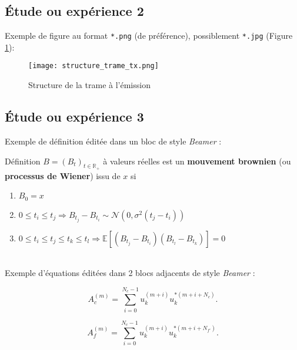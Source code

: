 \documentclass[11pt,a4paper,french]{article}
\def\Rset{\mathbb{R}} %
\def\Eset{\mathbb{E}} %
\begin{document}
\newpage %
\subsection{Étude ou expérience 2}\label{sec:SS_EXP2}

Exemple de figure au format \texttt{*.png} (de préférence), possiblement \texttt{*.jpg} (Figure \ref{fig:F_STRUCT_TRAME_TX}):

\begin{figure}[htb]
\centering
\texttt{[image: structure\_trame\_tx.png]}
\caption{Structure de la trame à l'émission}\label{fig:F_STRUCT_TRAME_TX}
\end{figure}

\subsection{Étude ou expérience 3}\label{sec:SS_EXP3}

Exemple de définition éditée dans un bloc de style \emph{Beamer} :

\begin{beamerblock}{Définition}
$B=(B_t)_{t\in\Rset_+}$ \`a valeurs r\'eelles est un {\bf mouvement brownien} (ou {\bf processus de Wiener}) issu de $x$ si
\begin{enumerate} 
\item $B_0=x$ 
\item $0\leq t_i\leq t_j \Rightarrow B_{t_j}-B_{t_i}\sim \mathcal{N}(0,\sigma^2(t_j-t_i))$
\item $0\leq t_i\leq t_j\leq t_k\leq t_l \Rightarrow \Eset[(B_{t_j}-B_{t_i})(B_{t_l}-B_{t_k})]=0$
\end{enumerate}
\end{beamerblock}

~\\ %
\indent
Exemple d'équations éditées dans 2 blocs adjacents de style \emph{Beamer} :

\begin{multicols}{2}
	
	\begin{beamerblock}{}
		\begin{equation}
		A_c^{(m)} = \sum_{i=0}^{N_c-1}u_k^{(m+i)}u_k^{*(m+i+N_c)}.
		\end{equation}
	\end{beamerblock}
	
	\begin{beamerblock}{}
		\begin{equation}
		A_f^{(m)} = \sum_{i=0}^{N_c-1}u_k^{(m+i)}u_k^{*(m+i+N_{f\prime})}.
		\end{equation}
	\end{beamerblock}
	
\end{multicols}
\end{document}

